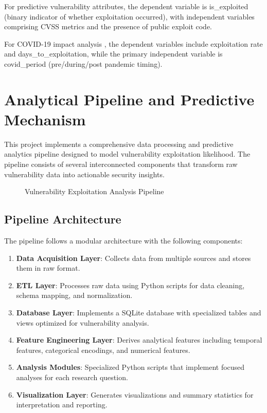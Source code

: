 \documentclass[runningheads]{llncs}
\begin{document}
For predictive vulnerability attributes, the dependent variable is is\_exploited (binary indicator of whether exploitation occurred), with independent variables comprising CVSS metrics and the presence of public exploit code.

For COVID-19 impact analysis \cite{covid_cybersecurity}, the dependent variables include exploitation rate and days\_to\_exploitation, while the primary independent variable is covid\_period (pre/during/post pandemic timing).

\section{Analytical Pipeline and Predictive Mechanism}
\label{sec:predictive_mechanism}

This project implements a comprehensive data processing and predictive analytics pipeline designed to model vulnerability exploitation likelihood. The pipeline consists of several interconnected components that transform raw vulnerability data into actionable security insights.

\begin{figure}[H]
\caption{Vulnerability Exploitation Analysis Pipeline}
\label{fig:pipeline}
\end{figure}

\subsection{Pipeline Architecture}
The pipeline follows a modular architecture with the following components:

\begin{enumerate}
    \item \textbf{Data Acquisition Layer}: Collects data from multiple sources and stores them in raw format.
    
    \item \textbf{ETL Layer}: Processes raw data using Python scripts for data cleaning, schema mapping, and normalization.
    
    \item \textbf{Database Layer}: Implements a SQLite database with specialized tables and views optimized for vulnerability analysis.
    
    \item \textbf{Feature Engineering Layer}: Derives analytical features including temporal features, categorical encodings, and numerical features.
    
    \item \textbf{Analysis Modules}: Specialized Python scripts that implement focused analyses for each research question.
    
    \item \textbf{Visualization Layer}: Generates visualizations and summary statistics for interpretation and reporting.
\end{enumerate}
\end{document}
